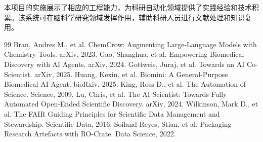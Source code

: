 ﻿\documentclass[a4paper,12pt]{article}
\begin{document}
本项目的实施展示了相应的工程能力，为科研自动化领域提供了实践经验和技术积累。该系统可在脑科学研究领域发挥作用，辅助科研人员进行文献处理和知识复用。

\begin{thebibliography}{99}
 Bran, Andres M., et al. ChemCrow: Augmenting Large-Language Models with Chemistry Tools. arXiv, 2023.
 Gao, Shanghua, et al. Empowering Biomedical Discovery with AI Agents. arXiv, 2024.
 Gottweis, Juraj, et al. Towards an AI Co-Scientist. arXiv, 2025.
 Huang, Kexin, et al. Biomini: A General-Purpose Biomedical AI Agent. bioRxiv, 2025.
 King, Ross D., et al. The Automation of Science. Science, 2009.
 Lu, Chris, et al. The AI Scientist: Towards Fully Automated Open-Ended Scientific Discovery. arXiv, 2024.
 Wilkinson, Mark D., et al. The FAIR Guiding Principles for Scientific Data Management and Stewardship. Scientific Data, 2016.
 Soiland-Reyes, Stian, et al. Packaging Research Artefacts with RO-Crate. Data Science, 2022.
\end{thebibliography}
\end{document}
